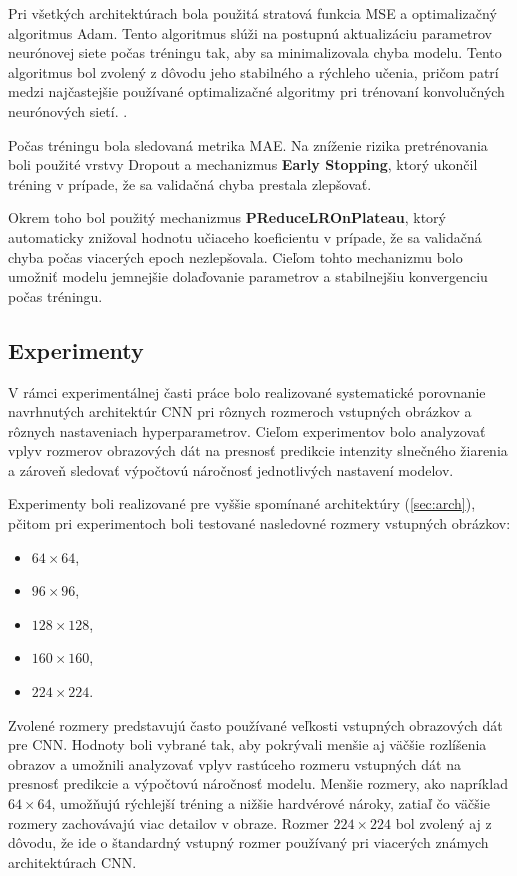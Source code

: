 Pri všetkých architektúrach bola použitá stratová funkcia MSE a optimalizačný algoritmus Adam. Tento algoritmus 
slúži na postupnú aktualizáciu parametrov neurónovej siete počas tréningu tak, 
aby sa minimalizovala chyba modelu. Tento algoritmus bol zvolený z dôvodu jeho stabilného a rýchleho učenia, 
pričom patrí medzi najčastejšie používané optimalizačné algoritmy pri trénovaní konvolučných neurónových sietí.
\cite{adam}. 

Počas tréningu bola sledovaná metrika MAE. Na zníženie rizika pretrénovania boli použité vrstvy 
Dropout a mechanizmus \textbf{Early Stopping}, ktorý ukončil tréning v prípade, že sa validačná chyba prestala 
zlepšovať.

Okrem toho bol použitý mechanizmus \textbf{PReduceLROnPlateau}, ktorý automaticky znižoval hodnotu učiaceho 
koeficientu v prípade, že sa validačná chyba počas viacerých epoch nezlepšovala. Cieľom tohto mechanizmu 
bolo umožniť modelu jemnejšie dolaďovanie parametrov a stabilnejšiu konvergenciu počas tréningu.



\vspace{\baselineskip}
\subsection{Experimenty}
V rámci experimentálnej časti práce bolo realizované systematické porovnanie navrhnutých architektúr 
CNN pri rôznych rozmeroch vstupných obrázkov a rôznych nastaveniach hyperparametrov. 
Cieľom experimentov bolo analyzovať vplyv rozmerov obrazových dát na presnosť predikcie intenzity slnečného 
žiarenia a zároveň sledovať výpočtovú náročnosť jednotlivých nastavení modelov.

Experimenty boli realizované pre vyššie spomínané architektúry (\ref{sec:arch}), pčitom 
pri experimentoch boli testované nasledovné rozmery vstupných obrázkov:
\begin{itemize}[nolistsep, noitemsep]
    \item $64 \times 64$,
    \item $96 \times 96$,
    \item $128 \times 128$,
    \item $160 \times 160$,
    \item $224 \times 224$.
\end{itemize}

Zvolené rozmery predstavujú často používané veľkosti vstupných obrazových dát pre CNN. 
Hodnoty boli vybrané tak, aby pokrývali menšie aj väčšie rozlíšenia obrazov a umožnili 
analyzovať vplyv rastúceho rozmeru vstupných dát na presnosť predikcie a výpočtovú náročnosť modelu. 
Menšie rozmery, ako napríklad $64 \times 64$, umožňujú rýchlejší tréning a nižšie hardvérové nároky, 
zatiaľ čo väčšie rozmery zachovávajú viac detailov v obraze. Rozmer $224 \times 224$ bol zvolený aj z
dôvodu, že ide o štandardný vstupný rozmer používaný pri viacerých známych architektúrach CNN.

